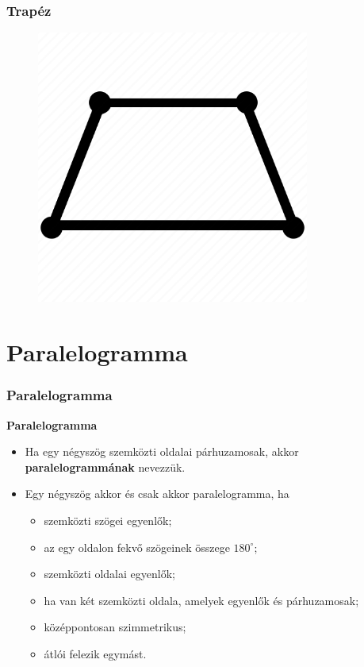 \documentclass[11pt]{beamer}
\begin{document}
\begin{frame}
\frametitle{Trapéz}
\begin{figure}
  \includegraphics[width=0.8\textwidth]{trapeze.png}
\end{figure}
\end{frame}

\section{\textbf{Paralelogramma}}
\begin{frame}[<+->]
\frametitle{Paralelogramma}
\begin{block}{\textbf{Paralelogramma}}
\begin{itemize}[label=$\circ$]
\item Ha egy négyszög szemközti oldalai párhuzamosak, akkor \textbf{paralelogrammának} nevezzük.
\item Egy négyszög akkor és csak akkor paralelogramma, ha
\begin{itemize}[label=$\cdot$]
\item szemközti szögei egyenlők;
\item az egy oldalon fekvő szögeinek összege $180^\circ$;
\item szemközti oldalai egyenlők;
\item ha van két szemközti oldala, amelyek egyenlők és párhuzamosak;
\item középpontosan szimmetrikus;
\item átlói felezik egymást.
\end{itemize}
\end{itemize}
\end{block}
\end{frame}
\end{document}
